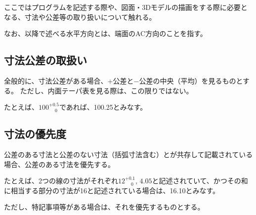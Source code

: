 
ここではプログラムを記述する際や、図面・3Dモデルの描画をする際に必要となる、寸法や公差等の取り扱いについて触れる。

なお、以降で述べる水平方向とは、端面のAC方向のことを指す。





\subsection{寸法公差の取扱い}
全般的に、寸法公差がある場合、$+$公差と$-$公差の中央（平均）を見るものとする。
ただし、内面テーパ表を見る際は、この限りではない。

たとえば、$100^{+0.5}_{\phantom -0}$であれば、100.25とみなす。


\subsection{寸法の優先度}
公差のある寸法と公差のない寸法（括弧寸法含む）とが共存して記載されている場合、公差のある寸法を優先する。

たとえば、2つの線の寸法がそれぞれ$12^{+0.1}_{\phantom -0}$, $4.05$と記述されていて、かつその和に相当する部分の寸法が16と記述されている場合は、16.10とみなす。

ただし、特記事項等がある場合は、それを優先するものとする。



\clearpage


